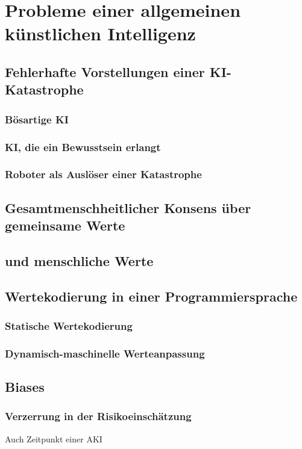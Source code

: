 \chapter{Probleme einer allgemeinen künstlichen Intelligenz}
\section{Fehlerhafte Vorstellungen einer KI-Katastrophe}
\subsection{Bösartige KI}
\subsection{KI, die ein Bewusstsein erlangt}
\subsection{Roboter als Auslöser einer Katastrophe}
\section{Gesamtmenschheitlicher Konsens über gemeinsame Werte}
\section{ und  menschliche Werte}
\section{Wertekodierung in einer Programmiersprache}
\subsection{Statische Wertekodierung}
\subsection{Dynamisch-maschinelle Werteanpassung}
\section{Biases}
\subsection{Verzerrung in der Risikoeinschätzung}
Auch Zeitpunkt einer AKI
